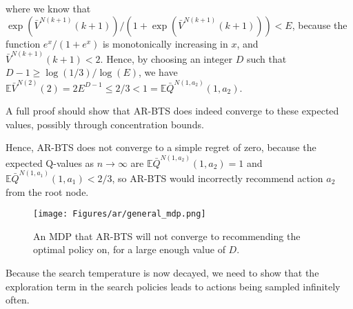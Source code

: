 \documentclass{article}
\newcommand{\crtodo}[1]{}
\newcommand{\bb}[1]{\mathbb{#1}}
\theoremstyle{plain}
\newenvironment{proofoutline}{\proof[Proof outline]}{\endproof}
\begin{document}
\begin{appendices}
\begin{proofoutline}
            where we know that $\exp\left(\bar{V}^{N(k+1)}(k+1)\right)/\left(1+\exp\left(\bar{V}^{N(k+1)}(k+1)\right)\right) < E$, because the function $e^x/(1+e^x)$ is monotonically increasing in $x$, and $\bar{V}^{N(k+1)}(k+1) < 2$. Hence, by choosing an integer $D$ such that $D-1 \geq \log(1/3) / \log(E)$, we have $\bb{E}\bar{V}^{N(2)}(2)=2E^{D-1}\leq 2/3 < 1 = \bb{E}\bar{Q}^{N(1,a_2)}(1,a_2)$. 

            A full proof should show that AR-BTS does indeed converge to these expected values, possibly through concentration bounds. 
            \crtodo{Do the full proof, and show that AR-BTS converges to these value with non zero prob, hence the non zero simple regret.} 

            Hence, AR-BTS does not converge to a simple regret of zero, because the expected Q-values as $n\rightarrow\infty$ are $\bb{E}\bar{Q}^{N(1,a_2)}(1,a_2)=1$ and $\bb{E}\bar{Q}^{N(1,a_1)}(1,a_1)<2/3$, so AR-BTS would incorrectly recommend action $a_2$ from the root node. 
            \crtodo{Formally give the simple regret converges to something strictly greater than zero. Also can I even do that intersection to product equality? Doesn't that mean that they are independent. Are they independent?}
        \end{proofoutline}
        
        \begin{figure}
            \centering
            \texttt{[image: Figures/ar/general\_mdp.png]}
            \caption{An MDP that AR-BTS will not converge to recommending the optimal policy on, for a large enough value of $D$.}
            \label{fig:ar_gen_mdp}
        \end{figure}




        
        





        Because the search temperature is now decayed, we need to show that the exploration term in the search policies leads to actions being sampled infinitely often.
        

\end{appendices}
\end{document}

